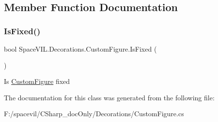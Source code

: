 \subsection{Member Function Documentation}
\mbox{\label{class_space_v_i_l_1_1_decorations_1_1_custom_figure_a4b2ff5319a7d0b34076da118107ee937}} 
\subsubsection{\texorpdfstring{Is\+Fixed()}{IsFixed()}}
{\footnotesize\ttfamily bool Space\+V\+I\+L.\+Decorations.\+Custom\+Figure.\+Is\+Fixed (\begin{DoxyParamCaption}{ }\end{DoxyParamCaption})}



Is \mbox{\hyperlink{class_space_v_i_l_1_1_decorations_1_1_custom_figure}{Custom\+Figure}} fixed 



The documentation for this class was generated from the following file\+:\begin{DoxyCompactItemize}
\item 
F\+:/spacevil/\+C\+Sharp\+\_\+doc\+Only/\+Decorations/Custom\+Figure.\+cs\end{DoxyCompactItemize}
